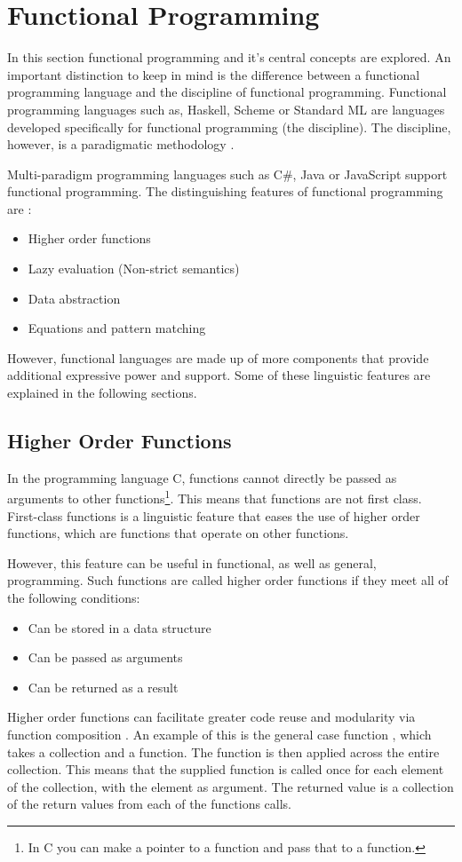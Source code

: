 \section{Functional Programming} \label{sec:functional-programming} 
In this section functional programming and it's central concepts are explored. An important distinction to keep in mind is the difference between a functional programming language and the discipline of functional programming. Functional programming languages such as, Haskell, Scheme or Standard ML are languages developed specifically for functional programming (the discipline). The discipline, however, is a paradigmatic methodology \cite{benton2016improving}.

Multi-paradigm programming languages such as C\#, Java or JavaScript support functional programming. The distinguishing features of functional programming are \cite{hudak1989conception}:
\begin{itemize}
    \item Higher order functions
    \item Lazy evaluation (Non-strict semantics)
    \item Data abstraction
    \item Equations and pattern matching
\end{itemize}

However, functional languages are made up of more components that provide additional expressive power and support. Some of these linguistic features are explained in the following sections.

\subsection{Higher Order Functions}
In the programming language C, functions cannot directly be passed as arguments to other functions\footnote{In C you can make a pointer to a function and pass that to a function.}. This means that functions are not first class. First-class functions is a linguistic feature that eases the use of higher order functions, which are functions that operate on other functions.

However, this feature can be useful in functional, as well as general, programming. Such functions are called higher order functions if they meet all of the following conditions:
\begin{itemize}
    \item Can be stored in a data structure
    \item Can be passed as arguments
    \item Can be returned as a result
\end{itemize}
Higher order functions can facilitate greater code reuse and modularity via function composition \cite{hughes1989functional}. An example of this is the general case function , which takes a collection and a function. The function is then applied across the entire collection. This means that the supplied function is called once for each element of the collection, with the element as argument. The returned value is a collection of the return values from each of the functions calls.

